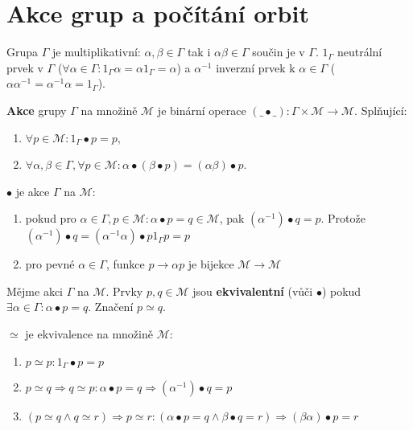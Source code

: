 \chapter{Akce grup a počítání orbit}

Grupa $\Gamma$ je multiplikativní: $\alpha, \beta \in \Gamma$ tak i $\alpha\beta \in \Gamma$ součin je v $\Gamma$. $1_{\Gamma}$ neutrální prvek v $\Gamma$ ($\forall \alpha \in \Gamma: 1_{\Gamma} \alpha = \alpha 1_{\Gamma} = \alpha$) a $\alpha^{-1}$ inverzní prvek k $\alpha \in \Gamma$ ($\alpha \alpha^{-1} = \alpha^{-1} \alpha = 1_{\Gamma}$).

\begin{definice}
	\textbf{Akce} grupy $\Gamma$ na množině $\mathcal{M}$ je binární operace $(\_ \bullet \_):\Gamma \times \mathcal{M} \to \mathcal{M}$. Splňující:
	
	\begin{enumerate}
		\item $\forall p \in \mathcal{M}: 1_{\Gamma} \bullet p = p$,
		\item $\forall \alpha, \beta \in \Gamma, \forall p \in \mathcal{M}: \alpha \bullet (\beta \bullet p) = (\alpha \beta)\bullet p$.
	\end{enumerate}
\end{definice}

\begin{pozor}
	$\bullet$ je akce $\Gamma$ na $\mathcal{M}$:
	
	\begin{enumerate}
		\item pokud pro $\alpha \in \Gamma, p \in \mathcal{M}: \alpha \bullet p = q \in \mathcal{M}$, pak $(\alpha^{-1})\bullet q = p$. Protože $(\alpha^{-1}) \bullet q = (\alpha^{-1} \alpha) \bullet p 1_{\Gamma} p = p$
		\item pro pevné $\alpha \in \Gamma$, funkce $p \to \alpha p$ je bijekce $\mathcal{M} \to \mathcal{M}$
	\end{enumerate}
\end{pozor}

\begin{definice}
	Mějme akci $\Gamma$ na $\mathcal{M}$. Prvky $p,q \in \mathcal{M}$ jsou \textbf{ekvivalentní} (vůči $\bullet$) pokud $\exists \alpha \in \Gamma: \alpha \bullet p = q$. Značení $p \simeq q$.
\end{definice}

\begin{pozor}
	$\simeq$ je ekvivalence na množině $\mathcal{M}$:
	
	\begin{enumerate}
		\item $p \simeq p: 1_{\Gamma} \bullet p = p$
		\item $p \simeq q \Rightarrow q \simeq p: \alpha \bullet p = q \Rightarrow (\alpha^{-1}) \bullet q = p$
		\item $(p \simeq q \land q \simeq r) \Rightarrow p \simeq r: (\alpha \bullet p = q \land \beta \bullet q = r) \Rightarrow (\beta \alpha) \bullet p = r$
	\end{enumerate}
\end{pozor}

